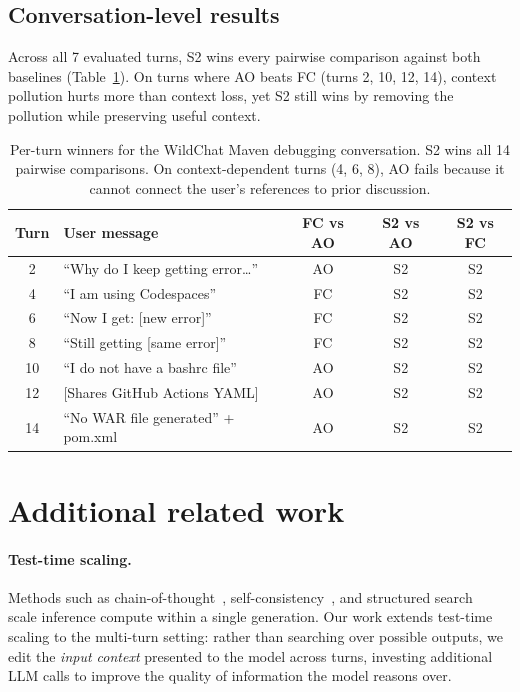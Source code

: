 \documentclass{article} %
\begin{document}
\subsection{Conversation-level results}

Across all 7 evaluated turns, S2 wins every pairwise comparison against both baselines (Table~\ref{tab:traj-turns}). On turns where AO beats FC (turns 2, 10, 12, 14), context pollution hurts more than context loss, yet S2 still wins by removing the pollution while preserving useful context.

\begin{table}[h]
\centering
\begin{tabular}{clccc}
\toprule
\textbf{Turn} & \textbf{User message} & \textbf{FC vs AO} & \textbf{S2 vs AO} & \textbf{S2 vs FC} \\
\midrule
2 & ``Why do I keep getting error\ldots'' & AO & S2 & S2 \\
4 & ``I am using Codespaces'' & FC & S2 & S2 \\
6 & ``Now I get: [new error]'' & FC & S2 & S2 \\
8 & ``Still getting [same error]'' & FC & S2 & S2 \\
10 & ``I do not have a bashrc file'' & AO & S2 & S2 \\
12 & [Shares GitHub Actions YAML] & AO & S2 & S2 \\
14 & ``No WAR file generated'' + pom.xml & AO & S2 & S2 \\
\bottomrule
\end{tabular}
\caption{Per-turn winners for the WildChat Maven debugging conversation. S2 wins all 14 pairwise comparisons. On context-dependent turns (4, 6, 8), AO fails because it cannot connect the user's references to prior discussion.}
\label{tab:traj-turns}
\end{table}


\section{Additional related work}
\label{app:additional-related}

\paragraph{Test-time scaling.}
Methods such as chain-of-thought~\citep{wei2022chain}, self-consistency~\citep{wang2023selfconsistency}, and structured search~\citep{yao2024tree} scale inference compute within a single generation. Our work extends test-time scaling to the multi-turn setting: rather than searching over possible outputs, we edit the \emph{input context} presented to the model across turns, investing additional LLM calls to improve the quality of information the model reasons over.
\end{document}
